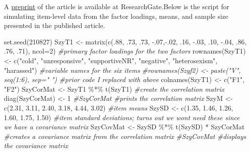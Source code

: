\documentclass[
  english,
]{book}
\newenvironment{Shaded}{\begin{snugshade}}{\end{snugshade}}
\newcommand{\AttributeTok}[1]{\textcolor[rgb]{0.77,0.63,0.00}{#1}}
\newcommand{\CommentTok}[1]{\textcolor[rgb]{0.56,0.35,0.01}{\textit{#1}}}
\newcommand{\DecValTok}[1]{\textcolor[rgb]{0.00,0.00,0.81}{#1}}
\newcommand{\FloatTok}[1]{\textcolor[rgb]{0.00,0.00,0.81}{#1}}
\newcommand{\FunctionTok}[1]{\textcolor[rgb]{0.00,0.00,0.00}{#1}}
\newcommand{\NormalTok}[1]{#1}
\newcommand{\OtherTok}[1]{\textcolor[rgb]{0.56,0.35,0.01}{#1}}
\newcommand{\SpecialCharTok}[1]{\textcolor[rgb]{0.00,0.00,0.00}{#1}}
\newcommand{\StringTok}[1]{\textcolor[rgb]{0.31,0.60,0.02}{#1}}
\begin{document}
A \href{https://www.researchgate.net/publication/332062781_Perceptions_of_the_LGBTQ_College_Campus_Climate_Scale_Development_and_Psychometric_Evaluation/link/5ca0bef945851506d7377da7/download}{preprint} of the article is available at ResearchGate.Below is the script for simulating item-level data from the factor loadings, means, and sample size presented in the published article.

\begin{Shaded}
\begin{Highlighting}[]
\FunctionTok{set.seed}\NormalTok{(}\DecValTok{210827}\NormalTok{)}
\NormalTok{SzyT1 }\OtherTok{\textless{}{-}} \FunctionTok{matrix}\NormalTok{(}\FunctionTok{c}\NormalTok{(.}\DecValTok{88}\NormalTok{, .}\DecValTok{73}\NormalTok{, .}\DecValTok{73}\NormalTok{, }\SpecialCharTok{{-}}\NormalTok{.}\DecValTok{07}\NormalTok{,}\SpecialCharTok{{-}}\NormalTok{.}\DecValTok{02}\NormalTok{, .}\DecValTok{16}\NormalTok{, }\SpecialCharTok{{-}}\NormalTok{.}\DecValTok{03}\NormalTok{, .}\DecValTok{10}\NormalTok{, }\SpecialCharTok{{-}}\NormalTok{.}\DecValTok{04}\NormalTok{, .}\DecValTok{86}\NormalTok{, .}\DecValTok{76}\NormalTok{, .}\DecValTok{71}\NormalTok{), }\AttributeTok{ncol=}\DecValTok{2}\NormalTok{) }\CommentTok{\#primary factor loadings for the two factors}
\FunctionTok{rownames}\NormalTok{(SzyT1) }\OtherTok{\textless{}{-}} \FunctionTok{c}\NormalTok{(}\StringTok{"cold"}\NormalTok{, }\StringTok{"unresponsive"}\NormalTok{, }\StringTok{"supportiveNR"}\NormalTok{, }\StringTok{"negative"}\NormalTok{, }\StringTok{"heterosexism"}\NormalTok{, }\StringTok{"harassed"}\NormalTok{) }\CommentTok{\#variable names for the six items}
\CommentTok{\#rownames(Szyf2) \textless{}{-} paste("V", seq(1:6), sep=" ") \#prior code I replaced with above}
\FunctionTok{colnames}\NormalTok{(SzyT1) }\OtherTok{\textless{}{-}} \FunctionTok{c}\NormalTok{(}\StringTok{"F1"}\NormalTok{, }\StringTok{"F2"}\NormalTok{)}
\NormalTok{SzyCorMat }\OtherTok{\textless{}{-}}\NormalTok{ SzyT1 }\SpecialCharTok{\%*\%} \FunctionTok{t}\NormalTok{(SzyT1) }\CommentTok{\#create the correlation matrix}
\FunctionTok{diag}\NormalTok{(SzyCorMat) }\OtherTok{\textless{}{-}} \DecValTok{1}
\CommentTok{\#SzyCorMat \#prints the correlation matrix}
\NormalTok{SzyM }\OtherTok{\textless{}{-}} \FunctionTok{c}\NormalTok{(}\FloatTok{2.31}\NormalTok{, }\FloatTok{3.11}\NormalTok{, }\FloatTok{2.40}\NormalTok{, }\FloatTok{3.18}\NormalTok{, }\FloatTok{4.44}\NormalTok{, }\FloatTok{3.02}\NormalTok{) }\CommentTok{\#item means}
\NormalTok{SzySD }\OtherTok{\textless{}{-}} \FunctionTok{c}\NormalTok{(}\FloatTok{1.35}\NormalTok{, }\FloatTok{1.46}\NormalTok{, }\FloatTok{1.26}\NormalTok{, }\FloatTok{1.60}\NormalTok{, }\FloatTok{1.75}\NormalTok{, }\FloatTok{1.50}\NormalTok{) }\CommentTok{\#item standard deviations; turns out we won\textquotesingle{}t need these since we have a covariance matrix}
\NormalTok{SzyCovMat }\OtherTok{\textless{}{-}}\NormalTok{ SzySD }\SpecialCharTok{\%*\%} \FunctionTok{t}\NormalTok{(SzySD) }\SpecialCharTok{*}\NormalTok{ SzyCorMat }\CommentTok{\#creates a covariance matrix from the correlation matrix}
\CommentTok{\#SzyCovMat \#displays the covariance matrix}


\end{Highlighting}
\end{Shaded}
\end{document}
